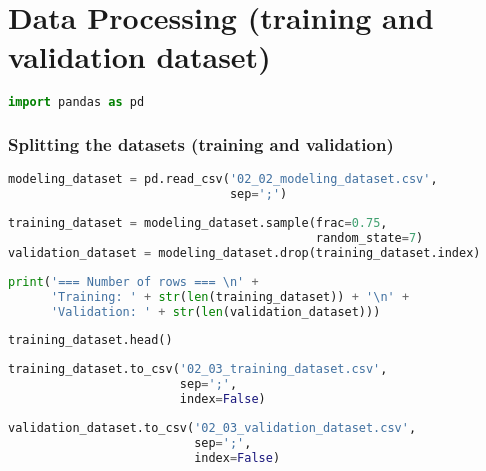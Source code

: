 \hypertarget{data-processing-training-and-validation-dataset}{%
\section{Data Processing (training and validation
dataset)}\label{data-processing-training-and-validation-dataset}}

\begin{lstlisting}[language=Python]
import pandas as pd
\end{lstlisting}

\hypertarget{splitting-the-datasets-training-and-validation}{%
\subsubsection{Splitting the datasets (training and
validation)}\label{splitting-the-datasets-training-and-validation}}

\begin{lstlisting}[language=Python]
modeling_dataset = pd.read_csv('02_02_modeling_dataset.csv',
                               sep=';')
\end{lstlisting}

\begin{lstlisting}[language=Python]
training_dataset = modeling_dataset.sample(frac=0.75,
                                           random_state=7)
validation_dataset = modeling_dataset.drop(training_dataset.index)
\end{lstlisting}

\begin{lstlisting}[language=Python]
print('=== Number of rows === \n' +
      'Training: ' + str(len(training_dataset)) + '\n' +
      'Validation: ' + str(len(validation_dataset)))
\end{lstlisting}

\begin{lstlisting}[language=Python]
training_dataset.head()
\end{lstlisting}

\begin{lstlisting}[language=Python]
training_dataset.to_csv('02_03_training_dataset.csv',
                        sep=';',
                        index=False)
\end{lstlisting}

\begin{lstlisting}[language=Python]
validation_dataset.to_csv('02_03_validation_dataset.csv',
                          sep=';',
                          index=False)
\end{lstlisting}

